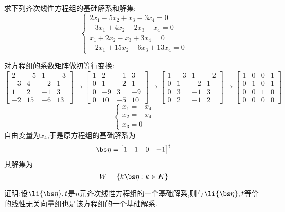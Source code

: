 \documentclass{ctexart}
\begin{document}
\begin{homework}[1(3)]
    求下列齐次线性方程组的基础解系和解集:
    \[\left\{\begin{array}{l}
        2x_1-5x_2+x_3-3x_4=0\\
        -3x_1+4x_2-2x_3+x_4=0\\
        x_1+2x_2-x_3+3x_4=0\\
        -2x_1+15x_2-6x_3+13x_4=0
    \end{array}\right.\]
\end{homework}
\begin{solution}
    对方程组的系数矩阵做初等行变换:
    \[\begin{bmatrix}
        2&-5&1&-3\\
        -3&4&-2&1\\
        1&2&-1&3\\
        -2&15&-6&13
    \end{bmatrix}\longrightarrow\begin{bmatrix}
        1&2&-1&3\\
        0&1&-2&1\\
        0&-9&3&-9\\
        0&10&-5&10
    \end{bmatrix}\longrightarrow\begin{bmatrix}
        1&-3&1&-2\\
        0&1&-2&1\\
        0&3&-1&3\\
        0&2&-1&2
    \end{bmatrix}\longrightarrow\begin{bmatrix}
        1&0&0&1\\
        0&1&0&1\\
        0&0&1&0\\
        0&0&0&0
    \end{bmatrix}\]
    \[\left\{\begin{array}{l}
        x_1=-x_4\\
        x_2=-x_4\\
        x_3=0
    \end{array}\right.\]
    自由变量为$x_4$,于是原方程组的基础解系为
    \[\bs\eta=\begin{bmatrix}
        1&1&0&-1
    \end{bmatrix}^{\text{t}}\]
    其解集为
    \[W=\left\{k\bs\eta:k\in K\right\}\]
\end{solution}
\begin{homework}[2]
    证明:设$\li{\bs\eta},t$是$n$元齐次线性方程组的一个基础解系,则与$\li{\bs\eta},t$等价的线性无关向量组也是该方程组的一个基础解系.
\end{homework}
\end{document}
